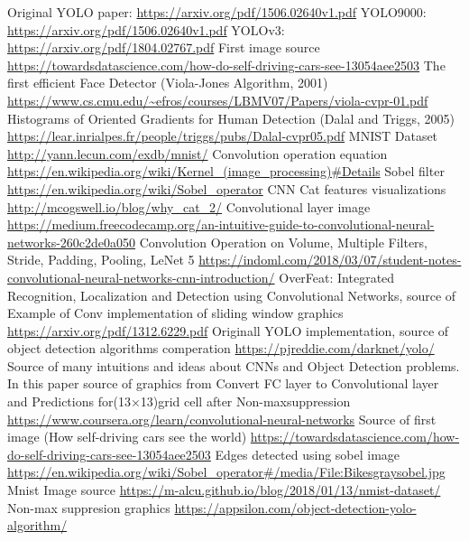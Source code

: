 \documentclass[letterpaper, 10 pt, conference]{ieeeconf}  %
\begin{document}
\begin{thebibliography}{99}

 Original YOLO paper: \url{https://arxiv.org/pdf/1506.02640v1.pdf}
 YOLO9000: \url{https://arxiv.org/pdf/1506.02640v1.pdf}
 YOLOv3: \url{https://arxiv.org/pdf/1804.02767.pdf} 
 First image source \url{https://towardsdatascience.com/how-do-self-driving-cars-see-13054aee2503}
 The first efficient Face Detector (Viola-Jones Algorithm, 2001) \url{https://www.cs.cmu.edu/~efros/courses/LBMV07/Papers/viola-cvpr-01.pdf}
 Histograms of Oriented Gradients for Human Detection
(Dalal and Triggs, 2005)  \url{https://lear.inrialpes.fr/people/triggs/pubs/Dalal-cvpr05.pdf}
 MNIST Dataset \url{http://yann.lecun.com/exdb/mnist/}
 Convolution operation equation \url{https://en.wikipedia.org/wiki/Kernel_(image_processing)#Details}
 Sobel filter \url{https://en.wikipedia.org/wiki/Sobel_operator}
 CNN Cat features visualizations \url{http://mcogswell.io/blog/why_cat_2/} 
 Convolutional layer image \url{https://medium.freecodecamp.org/an-intuitive-guide-to-convolutional-neural-networks-260c2de0a050}
 Convolution Operation on Volume, Multiple Filters, Stride, Padding, Pooling, LeNet 5 \url{https://indoml.com/2018/03/07/student-notes-convolutional-neural-networks-cnn-introduction/}
 OverFeat: Integrated Recognition, Localization and Detection using Convolutional Networks, source of Example of Conv implementation of sliding window graphics \url{https://arxiv.org/pdf/1312.6229.pdf}
 Originall YOLO implementation, source of object detection algorithms comperation \url{https://pjreddie.com/darknet/yolo/}
 Source of many intuitions and ideas about CNNs and Object Detection problems. In this paper source of graphics from Convert FC layer to Convolutional layer and  Predictions  for(13×13)grid  cell  after  Non-maxsuppression \url{https://www.coursera.org/learn/convolutional-neural-networks}
 Source of first image (How self-driving cars see the world) \url{https://towardsdatascience.com/how-do-self-driving-cars-see-13054aee2503}
 Edges detected using sobel image \url{https://en.wikipedia.org/wiki/Sobel_operator#/media/File:Bikesgraysobel.jpg}
 Mnist Image source \url{https://m-alcu.github.io/blog/2018/01/13/nmist-dataset/}
Non-max suppresion graphics \url{https://appsilon.com/object-detection-yolo-algorithm/}


\end{thebibliography}
\end{document}
